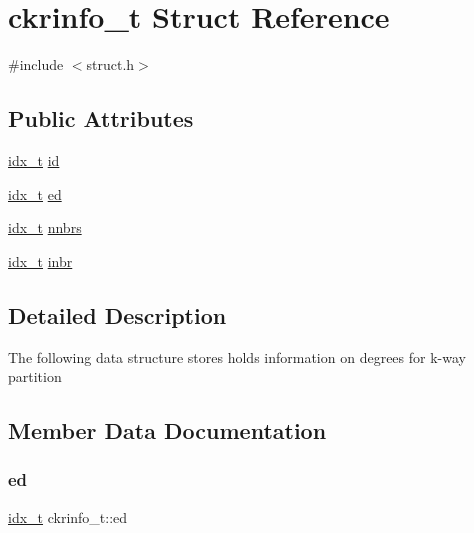 \hypertarget{structckrinfo__t}{}\section{ckrinfo\+\_\+t Struct Reference}
\label{structckrinfo__t}


{\ttfamily \#include $<$struct.\+h$>$}

\subsection*{Public Attributes}
\begin{DoxyCompactItemize}
\item 
\hyperlink{3rd_party_2parmetis-4_80_83_2metis_2include_2metis_8h_aaa5262be3e700770163401acb0150f52}{idx\+\_\+t} \hyperlink{structckrinfo__t_a6d1da388f70555f25dc90fdcc011bb9b}{id}
\item 
\hyperlink{3rd_party_2parmetis-4_80_83_2metis_2include_2metis_8h_aaa5262be3e700770163401acb0150f52}{idx\+\_\+t} \hyperlink{structckrinfo__t_a57270f8839a5146d9342569f12865e57}{ed}
\item 
\hyperlink{3rd_party_2parmetis-4_80_83_2metis_2include_2metis_8h_aaa5262be3e700770163401acb0150f52}{idx\+\_\+t} \hyperlink{structckrinfo__t_a73fbc8555b843b3fd414ac0a9ec244f1}{nnbrs}
\item 
\hyperlink{3rd_party_2parmetis-4_80_83_2metis_2include_2metis_8h_aaa5262be3e700770163401acb0150f52}{idx\+\_\+t} \hyperlink{structckrinfo__t_aca4e2d97adbc1b6401b4ee8acba70770}{inbr}
\end{DoxyCompactItemize}


\subsection{Detailed Description}
The following data structure stores holds information on degrees for k-\/way partition 

\subsection{Member Data Documentation}
\mbox{\label{structckrinfo__t_a57270f8839a5146d9342569f12865e57}} 
\subsubsection{\texorpdfstring{ed}{ed}}
{\footnotesize\ttfamily \hyperlink{3rd_party_2parmetis-4_80_83_2metis_2include_2metis_8h_aaa5262be3e700770163401acb0150f52}{idx\+\_\+t} ckrinfo\+\_\+t\+::ed}


